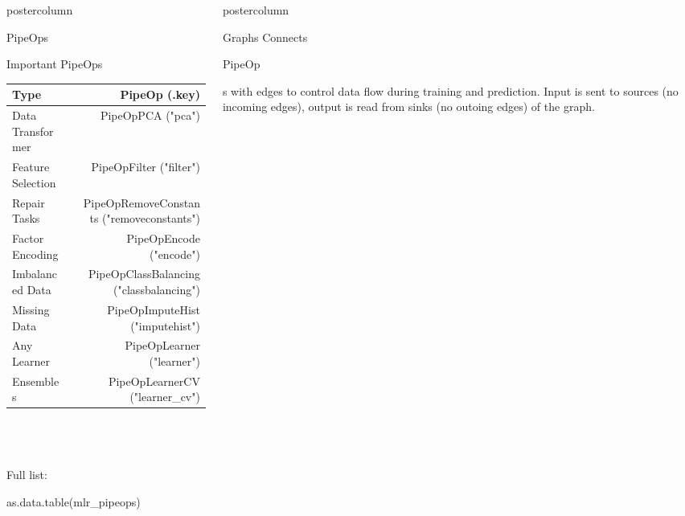 \documentclass{beamer}
\newlength{\columnheight} %
\newcommand{\codeinline}[1]{\begin{codeboxinline}#1\end{codeboxinline}}
\begin{document}
\begin{frame}[fragile]{}
\begin{columns}
\begin{column}{.245\textwidth}
\begin{beamercolorbox}[center]{postercolumn}
\begin{minipage}{.98\textwidth}
{\begin{myblock}{PipeOps}
\begin{itemize}
              \end{itemize}
  			\end{myblock}
            \begin{myblock}{Important PipeOps}
              \begin{footnotesize}
                \begin{centering}
                  \begin{tabular}{l c r}
                    \textbf{Type} & & \textbf{PipeOp (.key)} \\ \hline
                    Data Transformer & & PipeOpPCA ("pca")\\
                    Feature Selection & & PipeOpFilter ("filter")\\
                    Repair Tasks & & PipeOpRemoveConstants ("removeconstants")\\
                    Factor Encoding & & PipeOpEncode ("encode")\\
                    Imbalanced Data & & PipeOpClassBalancing ("classbalancing")\\
                    Missing Data & & PipeOpImputeHist ("imputehist")\\
                    Any Learner & & PipeOpLearner ("learner")\\
                    Ensembles & & PipeOpLearnerCV ("learner\_cv")\\ \hline
                  \end{tabular}
                \end{centering}
              \end{footnotesize}
              \ \\
              \ \\
              \ \\
              Full list: \codeinline{as.data.table(mlr\_pipeops)}
						\end{myblock}
						\vfill}
				\end{minipage}
			\end{beamercolorbox}
		\end{column}
		\begin{column}{.245\textwidth}
			\begin{beamercolorbox}[center]{postercolumn}
				\begin{minipage}{.98\textwidth}
					\parbox[t][\columnheight]{\textwidth}{
						\begin{myblock}{Graphs}
              Connects \codeinline{PipeOp}s with edges to control data flow during training and prediction.
              Input is sent to sources (no incoming edges), output is read from sinks (no outoing edges) 
              of the graph.


\end{myblock}}
\end{minipage}
\end{beamercolorbox}
\end{column}
\end{columns}
\end{frame}
\end{document}

